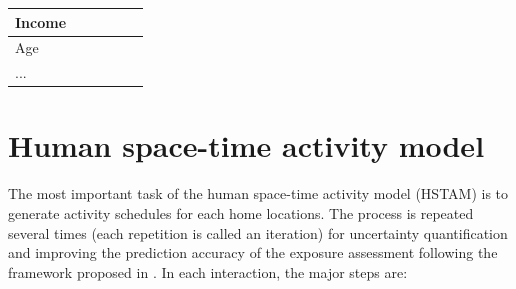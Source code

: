 \documentclass[]{article}
\begin{document}
\begin{table}[!h]
{\begin{tabular}{l|l|l|l|l|l}
Income         &                        &                                                                                                      &                                                                                   &                                                                  &                                                                                                                                                                   \\ \hline
Age            &                        &                                                                                                      &                                                                                   &                                                                  &                                                                                                                                                                   \\ \hline
...            &                        &                                                                                                      &                                                                                   &                                                                  &                                                                                                                                                                   \\ \hline
\end{tabular}%
}
\end{table}

\section{Human space-time activity model}
\label{sec:model}

The most important task of the human space-time activity model (HSTAM) is to generate activity schedules for each home locations. The process is repeated several times (each repetition is called an iteration) for uncertainty quantification and improving the prediction accuracy of the exposure assessment following the framework proposed in \cite{lu2019activity}.  In each interaction, the major steps are:   
\end{document}

